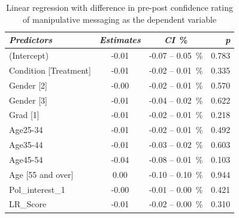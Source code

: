 \documentclass[empirical, authordate]{jote-new-article}
\begin{document}
\begin{table}

  \caption{Linear regression with difference in pre-post confidence rating of manipulative messaging as the dependent variable }
  \label{tab:tableS34}



  \begin{tabularx}{\linewidth}{@{} X  S  S[table-space-text-post=\,\%]<{\,\%}
    r @{}}

    \toprule
    \emph{Predictors}                                    & {\emph{Estimates}}                         & {\emph{\emph{CI}}} & {\emph{p}}     \\
    \midrule
    (Intercept)                                          & -0.01                                      & -0.07 -- 0.05      & 0.783          \\
    Condition [Treatment]                                & -0.01                                      & -0.02 -- 0.01      & 0.335          \\
    Gender [2]                                           & -0.00                                      & -0.02 -- 0.01      & 0.570          \\
    Gender [3]                                           & -0.01                                      & -0.04 -- 0.02      & 0.622          \\
    Grad [1]                                             & -0.01                                      & -0.02 -- 0.01      & 0.218          \\
    Age25-34                                             & -0.01                                      & -0.02 -- 0.01      & 0.492          \\
    Age35-44                                             & -0.01                                      & -0.03 -- 0.02      & 0.603          \\
    Age45-54                                             & -0.04                                      & -0.08 -- 0.01      & 0.103          \\
    Age [55 and over]                                    & 0.00                                       & -0.10 -- 0.10      & 0.944          \\
    Pol\_interest\_1                                     & -0.00                                      & -0.01 -- 0.00      & 0.421          \\
    LR\_Score                                            & -0.01                                      & -0.02 -- 0.00      & 0.310          \\

\end{tabularx}
\end{table}
\end{document}
